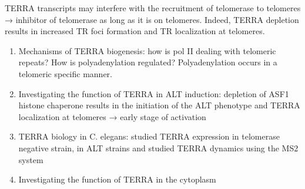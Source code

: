 TERRA transcripts may interfere with the recruitment of telomerase to
telomeres → inhibitor of telomerase as long as it is on telomeres.
Indeed, TERRA depletion results in increased TR foci formation and TR
localization at telomeres.

\begin{enumerate}
\def\labelenumi{\arabic{enumi}.}
\tightlist
\item
  Mechanisms of TERRA biogenesis: how is pol II dealing with telomeric
  repeats? How is polyadenylation regulated? Polyadenylation occurs in a
  telomeric specific manner.
\item
  Investigating the function of TERRA in ALT induction: depletion of
  ASF1 histone chaperone results in the initiation of the ALT phenotype
  and TERRA localization at telomeres → early stage of activation
\item
  TERRA biology in C. elegans: studied TERRA expression in telomerase
  negative strain, in ALT strains and studied TERRA dynamics using the
  MS2 system
\item
  Investigating the function of TERRA in the cytoplasm
\end{enumerate}

